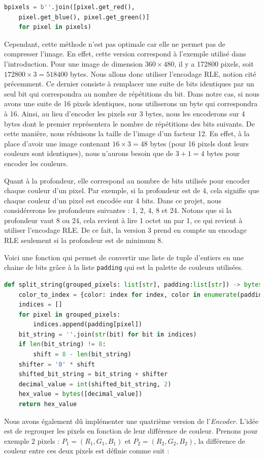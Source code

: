 \documentclass[utf8]{article}
\begin{document}
\begin{lstlisting}[language=Python, basicstyle=\small]
bpixels = b''.join([pixel.get_red(), 
	pixel.get_blue(), pixel.get_green()] 
	for pixel in pixels)
\end{lstlisting}

Cependant, cette méthode n'est pas optimale car elle ne permet pas de compresser l'image. En effet, cette version correspond à l'exemple utilisé dans l'introduction. Pour une image de dimension $360 \times 480$, il y a 172800 pixels, soit $172800 \times 3 = 518400$ bytes. Nous allons donc utiliser l'encodage RLE, notion cité précemment. Ce dernier consiste à remplacer une suite de bits identiques par un seul bit qui correspondra au nombre de répétitions du bit. Dans notre cas, si nous avons une suite de 16 pixels identiques, nous utiliserons un byte qui correspondra à 16. Ainsi, au lieu d'encoder les pixels sur 3 bytes, nous les encoderons sur 4 bytes dont le premier représentera le nombre de répétitions des bits suivants. De cette manière, nous réduisons la taille de l'image d'un facteur 12. En effet, à la place d'avoir une image contenant $16 \times 3 = 48$ bytes (pour 16 pixels dont leurs couleurs sont identiques), nous n'aurons besoin que de $3+1 = 4$ bytes pour encoder les couleurs.

Quant à la profondeur, elle correspond au nombre de bits utilisés pour encoder chaque couleur d'un pixel. Par exemple, si la profondeur est de 4, cela signifie que chaque couleur d'un pixel est encodée sur 4 bits. Dans ce projet, nous considérerons les profondeurs suivantes : 1, 2, 4, 8 et 24. Notons que si la profondeur vaut 8 ou 24, cela revient à lire 1 octet un par 1, ce qui revient à utiliser l'encodage RLE. De ce fait, la version 3 prend en compte un encodage RLE seulement si la profondeur est de minimum 8.  

Voici une fonction qui permet de convertir une liste de tuple d'entiers en une chaine de bits grâce à la liste \texttt{padding} qui est la palette de couleurs utilisées.
\begin{lstlisting}[language=Python, basicstyle=\small]
def split_string(grouped_pixels: list[str], padding:list[str]) -> bytes:
	color_to_index = {color: index for index, color in enumerate(padding)}
	indices = []
	for pixel in grouped_pixels:   	
		indices.append(padding[pixel])
	bit_string = ''.join(str(bit) for bit in indices)
	if len(bit_string) != 8:  
		shift = 8 - len(bit_string)
	shifter = '0' * shift
	shifted_bit_string = bit_string + shifter
	decimal_value = int(shifted_bit_string, 2)
	hex_value = bytes([decimal_value])
	return hex_value
\end{lstlisting}
Nous avons également dû implémenter une quatrième  version de l'\textit{Encoder}. L'idée est de regrouper les pixels en fonction de leur différence de couleur. Prenons pour exemple 2 pixels : $P_1 = (R_1, G_1, B_1)$ et $P_2 = (R_2, G_2, B_2)$, la différence de couleur entre ces deux pixels est définie comme suit : 
\end{document}
